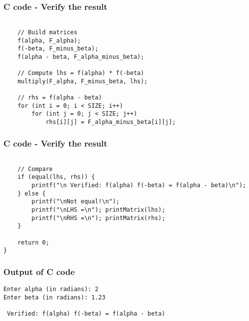 \documentclass{beamer}
\begin{document}
\begin{frame}[fragile]                            
\frametitle{C code - Verify the result}                
\begin{lstlisting}

    // Build matrices
    f(alpha, F_alpha);
    f(-beta, F_minus_beta);
    f(alpha - beta, F_alpha_minus_beta);

    // Compute lhs = f(alpha) * f(-beta)
    multiply(F_alpha, F_minus_beta, lhs);

    // rhs = f(alpha - beta)
    for (int i = 0; i < SIZE; i++)
        for (int j = 0; j < SIZE; j++)
            rhs[i][j] = F_alpha_minus_beta[i][j];
\end{lstlisting}
\end{frame}

\begin{frame}[fragile]                            
\frametitle{C code - Verify the result}                
\begin{lstlisting}

    // Compare
    if (equal(lhs, rhs)) {
        printf("\n Verified: f(alpha) f(-beta) = f(alpha - beta)\n");
    } else {
        printf("\nNot equal!\n");
        printf("\nLHS =\n"); printMatrix(lhs);
        printf("\nRHS =\n"); printMatrix(rhs);
    }

    return 0;
}

\end{lstlisting}
\end{frame}

\begin{frame}[fragile]                            
\frametitle{Output of C code}                
\begin{lstlisting}
Enter alpha (in radians): 2
Enter beta (in radians): 1.23

 Verified: f(alpha) f(-beta) = f(alpha - beta)

\end{lstlisting}
\end{frame}
\end{document}
